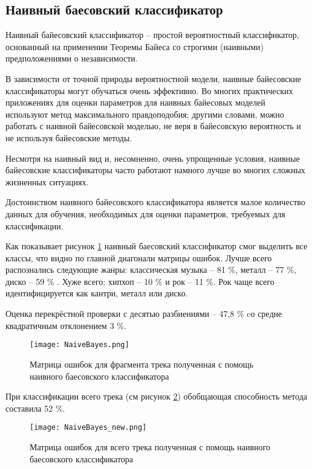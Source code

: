 \subsection{Наивный баесовский классификатор}

Наивный байесовский классификатор -- простой вероятностный классификатор, основанный на применении Теоремы Байеса со строгими (наивными) предположениями о независимости.

В зависимости от точной природы вероятностной модели, наивные байесовские классификаторы могут обучаться очень эффективно. Во многих практических приложениях для оценки параметров для наивных байесовых моделей используют метод максимального правдоподобия; другими словами, можно работать с наивной байесовской моделью, не веря в байесовскую вероятность и не используя байесовские методы.

Несмотря на наивный вид и, несомненно, очень упрощенные условия, наивные байесовские классификаторы часто работают намного лучше во многих сложных жизненных ситуациях.

Достоинством наивного байесовского классификатора является малое количество данных для обучения, необходимых для оценки параметров, требуемых для классификации.

Как показывает рисунок \ref{fig:results:NaiveBayes} наивный баесовский классификатор смог выделить все классы, что видно по главной диагонали матрицы ошибок. Лучше всего распознались следующие жанры: классическая музыка -- 81 \%, металл -- 77 \%, диско -- 59 \% . Хуже всего: хипхоп -- 10 \% и рок -- 11 \%.  Рок чаще всего идентифицируется как кантри, металл или диско.

Оценка перекрёстной проверки с десятью разбиениями -- 47,8 \% cо средне квадратичным отклонением 3 \%.  

\begin{figure}[h]
\centering
  \texttt{[image: NaiveBayes.png]}
  \caption{Матрица ошибок  для фрагмента трека полученная с помощь наивного баесовского классификатора}
  \label{fig:results:NaiveBayes}
\end{figure}

При классификации всего трека (см рисунок \ref{fig:results:NaiveBayes_new}) обобщающая способность метода составила 52 \%. 

\begin{figure}[h]
\centering
  \texttt{[image: NaiveBayes\_new.png]}
  \caption{Матрица ошибок  для всего трека полученная с помощь наивного баесовского классификатора}
  \label{fig:results:NaiveBayes_new}
\end{figure}

